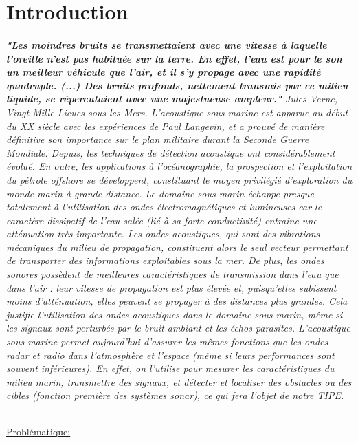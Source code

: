 \documentclass[a4paper,11pt]{article}
\begin{document}
\part*{Introduction}
\normalsize \paragraph{\normalfont \textbf{"Les moindres bruits se transmettaient avec une vitesse \`{a} laquelle l'oreille n'est pas habitu\'{e}e sur la terre. En effet, l'eau est pour le son un meilleur v\'{e}hicule que l'air, et il s'y propage avec une rapidit\'{e} quadruple. (...)  Des bruits profonds, nettement transmis par ce milieu liquide, se r\'{e}percutaient avec une majestueuse ampleur."} \newline Jules Verne, \textit{Vingt Mille Lieues sous les Mers.} \newline \newline
L'acoustique sous-marine est apparue au d\'{e}but du XX si\`{e}cle avec les exp\'{e}riences de Paul Langevin, et a prouv\'{e} de mani\`{e}re d\'{e}finitive son importance sur le plan militaire durant la Seconde Guerre Mondiale. Depuis, les techniques de d\'{e}tection acoustique ont consid\'{e}rablement \'{e}volu\'{e}. En outre, les applications \`{a} l'oc\'{e}anographie, la prospection et l'exploitation du p\'{e}trole offshore se d\'{e}veloppent, constituant le moyen privil\'{e}gi\'{e} d'exploration du monde marin \`{a} grande distance. \newline \newline
Le domaine sous-marin \'{e}chappe presque totalement \`{a} l'utilisation des ondes \'{e}lectromagn\'{e}tiques et lumineuses car le caract\`{e}re dissipatif de l'eau sal\'{e}e (li\'{e} \`{a} sa forte conductivit\'{e}) entra\^{i}ne une att\'{e}nuation tr\`{e}s importante. Les ondes acoustiques, qui sont des vibrations m\'{e}caniques du milieu de propagation, constituent alors le seul vecteur permettant de transporter des informations exploitables sous la mer. De plus, les ondes sonores poss\`{e}dent de meilleures caract\'{e}ristiques de transmission dans l'eau que dans l'air : leur vitesse de propagation est plus \'{e}lev\'{e}e et, puisqu'elles subissent moins d'att\'{e}nuation, elles peuvent se propager \`{a} des distances plus grandes. Cela justifie l'utilisation des ondes acoustiques dans le domaine sous-marin, m\^{e}me si les signaux sont perturb\'{e}s par le bruit ambiant et les \'{e}chos parasites.
L'acoustique sous-marine permet aujourd'hui d'assurer les m\^{e}mes fonctions que les ondes radar et radio dans l'atmosph\`{e}re et l'espace (m\^{e}me si leurs performances sont souvent inf\'{e}rieures). En effet, on l'utilise pour mesurer les caract\'{e}ristiques du milieu marin, transmettre des signaux, et d\'{e}tecter et localiser des obstacles ou des cibles (fonction premi\`{e}re des syst\`{e}mes sonar), ce qui fera l'objet de notre TIPE.\newline}
\begin{center}
\large{\underline{Probl\'{e}matique:}}
\end{center}
\end{document}
